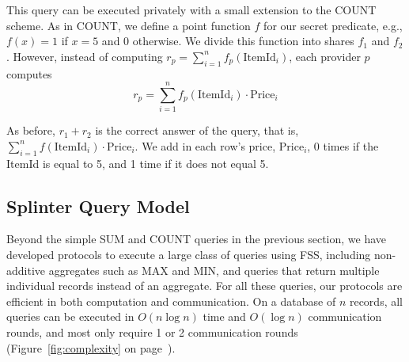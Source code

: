 This query can be executed privately with a small extension to the COUNT scheme.
As in COUNT, we define a point function $f$ for our secret predicate, e.g.,
$f(x)=1$ if $x=5$ and 0 otherwise.
We divide this function into shares $f_1$ and $f_2$.
However, instead of computing
$r_p = \sum_{i=1}^n f_p(\mathrm{ItemId}_i)$,
each provider $p$ computes
$$r_p = \sum_{i=1}^n f_p(\mathrm{ItemId}_i) \cdot \mathrm{Price}_i$$

As before, $r_1 + r_2$ is the correct answer of the query,
that is, $\sum_{i=1}^n f(\mathrm{ItemId}_i) \cdot \mathrm{Price}_i$.
We add in each row's price, $\mathrm{Price}_i$, 0 times if the ItemId is equal to 5,
and 1 time if it does not equal 5.

\subsection{Splinter Query Model}
\label{sec:querymodel}

Beyond the simple SUM and COUNT queries in the previous section, 
we have developed
protocols to execute a large class of queries using FSS, including
non-additive aggregates such as MAX and MIN, and queries that return multiple
individual records instead of an aggregate.
For all these queries, our protocols are efficient in both
computation and communication.
On a database of $n$ records, all queries can be executed in $O(n \log n)$ time
and $O(\log n)$ communication rounds, and most only require 1 or 2 communication rounds
(Figure~\ref{fig:complexity} on page~\pageref{fig:complexity}).

